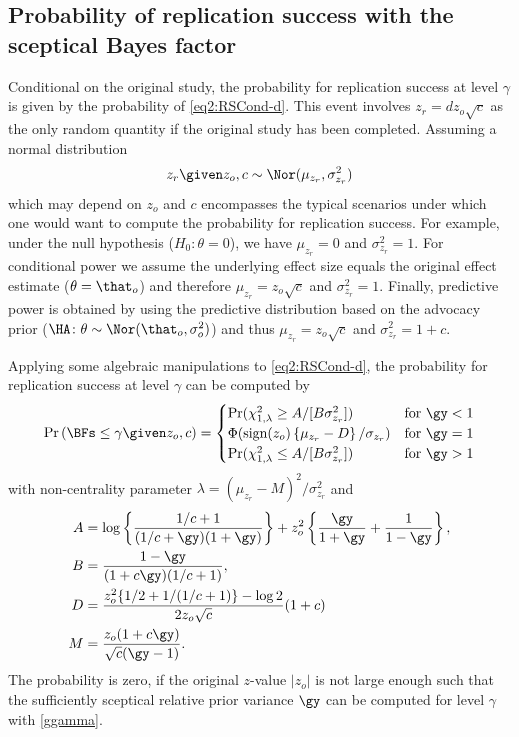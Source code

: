 \begin{subappendices}
\section{Probability of replication success with the sceptical Bayes factor}
\label{app:powerBFs}
Conditional on the original study, the probability for replication success at
level $\gamma$ is given by the probability of \eqref{eq2:RSCond-d}. This event
involves $z_r = dz_o \sqrt{c}$ as the only random quantity if the original study
has been completed. Assuming a normal distribution
\begin{align*}
  z_r \given z_o, c \sim \Nor(\mu_{z_r}, \sigma^2_{z_r})
\end{align*}
which may depend on $z_o$ and $c$ encompasses the typical scenarios under which
one would want to compute the probability for replication success. For example,
under the null hypothesis ($H_{0} \colon \theta = 0$), we have $\mu_{z_r} = 0$
and $\sigma^2_{z_r} = 1$. For conditional power we assume the underlying effect
size equals the original effect estimate ($\theta = \that_o$) and therefore
$\mu_{z_r} = z_o \sqrt{c}$ and $\sigma^2_{z_r} = 1$. Finally, predictive power
is obtained by using the predictive distribution based on the advocacy prior
($\HA \colon \theta \sim \Nor(\that_o, \sigma^2_o)$) and thus
$\mu_{z_r} = z_o \sqrt{c}$ and $\sigma^2_{z_r} = 1 + c$.

Applying some algebraic manipulations to \eqref{eq2:RSCond-d}, the
probability for replication success at level $\gamma$ can be computed by
\begin{align}
  \label{eq2:powerBFs}
  \Pr\left(\BFs \leq \gamma \given z_o, c\right) =
  \begin{cases}
    \Pr(\chi^2_{1,\lambda} \geq  A/[B \sigma^2_{z_r}])
    & \text{for} ~ \gy < 1 \\
    \Phi(\text{sign}(z_o) \left\{\mu_{z_r} - D\right\}/\sigma_{z_r})
    & \text{for} ~ \gy = 1 \\
    \Pr(\chi^2_{1,\lambda} \leq A/[B \sigma^2_{z_r}])
    & \text{for} ~ \gy > 1
  \end{cases}
\end{align}
with non-centrality parameter $\lambda = (\mu_{z_r} - M)^2/\sigma^2_{z_r}$
and
\begin{align*}
  A &= \log \left\{ \frac{1/c + 1}{(1/c + \gy)(1 + \gy)}\right\} +
  z_o^2 \left\{\frac{\gy}{1 + \gy} + \frac{1}{1 - \gy} \right\}, \\
  B &= \frac{1 - \gy}{(1 + c\gy)(1/c + 1)}, \\
  D &= \frac{z_o^2 \{1/2 + 1/(1/c + 1)\} - \log 2}{2 z_o \sqrt{c}} (1 + c) \\
  M &= \frac{z_o(1 + c\gy)}{\sqrt{c}(\gy - 1)}.
\end{align*}
The probability is zero, if the original $z$-value $|z_o|$ is not large enough
such that the sufficiently sceptical relative prior variance $\gy$ can be
computed for level $\gamma$ with \eqref{ggamma}.


\end{subappendices}

